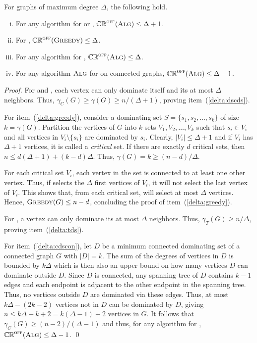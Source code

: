 \begin{proposition}
\label{prop:delta-upper}
For graphs of maximum degree $\Delta$, the following hold.
\begin{enumerate}[(i)]
\item \label{delta:dscds} For any algorithm \ALG for \ds or \cds, $\mathbb{CR}^{\textsc{off}}(\operatorname{\textsc{Alg}}) \le \Delta+1$.
\item \label{delta:greedy} For \ds, $\mathbb{CR}^{\textsc{off}}(\textsc{Greedy}) \le \Delta$.
\item \label{delta:tds} For any algorithm \ALG for \tds, $\mathbb{CR}^{\textsc{off}}(\operatorname{\textsc{Alg}}) \le \Delta$.
\item \label{delta:cdscon} For any algorithm $\operatorname{\textsc{Alg}}$ for \cds on connected graphs, $\mathbb{CR}^{\textsc{off}}(\operatorname{\textsc{Alg}}) \le \Delta -1$.
\end{enumerate}
\end{proposition}
\begin{proof}
For \ds and \cds, each vertex can only dominate itself and its at most $\Delta$
neighbors. Thus, $\gamma_C(G) \geq \gamma(G)\ge n/ (\Delta +1)$,
proving item~(\ref{delta:dscds}).

For item~(\ref{delta:greedy}), consider a dominating set $S = \{s_1, s_2,
\ldots, s_k\}$ of size $k=\gamma(G)$.
Partition the vertices of $G$ into $k$ sets $V_1, V_2, \ldots, V_k$
such that $s_i \in V_i$ and all vertices in $V_i \setminus \{s_i\}$
are dominated by $s_i$.
Clearly, $|V_i| \leq \Delta+1$ and 
if $V_i$ has $\Delta+1$ vertices, it is called a {\em critical} set.
If there are exactly $d$ critical sets, then
$n \leq d(\Delta+1) + (k-d)\Delta$.
Thus, $\gamma(G)=k \geq (n-d)/\Delta$.

For each critical set $V_i$, each vertex in the set is connected to at least
one other vertex.
Thus, if \greedy selects the $\Delta$ first vertices of $V_i$, it will
not select the last vertex of $V_i$.
This shows that, from each critical set, \greedy will select at most
$\Delta$ vertices.
Hence, $\textsc{Greedy}(G) \leq n -d$, concluding the proof of
item~(\ref{delta:greedy}). 

For \tds, a vertex can only dominate its at most $\Delta$
neighbors. Thus, $\gamma_T(G)\ge n/ \Delta$, proving
item~(\ref{delta:tds}).

For item~(\ref{delta:cdscon}), let $D$ be a minimum connected
dominating set of a connected graph $G$ with $|D| = k$.
The sum of the degrees of vertices in $D$ is bounded by
$k\Delta$ which is then also an upper bound on how many vertices
$D$ can dominate outside $D$.
Since $D$ is connected, 
any spanning tree of $D$ contains $k-1$ edges
and each endpoint is adjacent to the other endpoint in the spanning tree.
Thus, no vertices outside $D$ are dominated via these
edges.
Thus, at most 
$k\Delta - (2k-2)$ vertices not in $D$ can be dominated by $D$,
giving $n \leq k\Delta-k+2 = k(\Delta-1)+2$ vertices in $G$.
It follows that $\gamma_C(G) \ge (n-2)/(\Delta -1)$ and thus, for any
algorithm \ALG for \cds, $\mathbb{CR}^{\textsc{off}}(\operatorname{\textsc{Alg}}) \le \Delta -1$.
\qed\end{proof}

